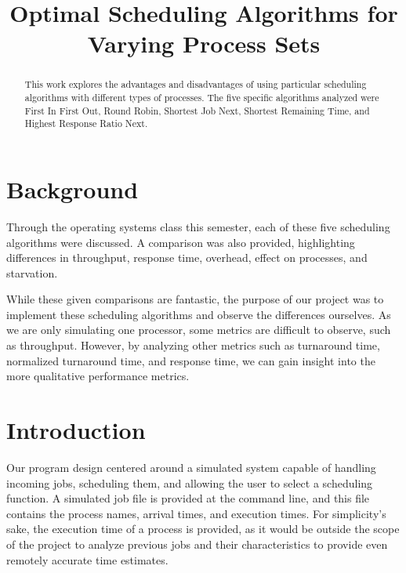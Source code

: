\documentclass[conference,11pt]{IEEEtran}
\begin{document}
%
\title{Optimal Scheduling Algorithms for Varying Process Sets}

\author{
}

\maketitle

\begin{abstract}
This work explores the advantages and disadvantages of using particular scheduling algorithms with different types of processes. The five specific algorithms analyzed were First In First Out, Round Robin, Shortest Job Next, Shortest Remaining Time, and Highest Response Ratio Next.
\end{abstract}

\section{Background}
Through the operating systems class this semester, each of these five scheduling algorithms were discussed. A comparison was also provided, highlighting differences in throughput, response time, overhead, effect on processes, and starvation.

While these given comparisons are fantastic, the purpose of our project was to implement these scheduling algorithms and observe the differences ourselves. As we are only simulating one processor, some metrics are difficult to observe, such as throughput. However, by analyzing other metrics such as turnaround time, normalized turnaround time, and response time, we can gain insight into the more qualitative performance metrics.

\section{Introduction}
Our program design centered around a simulated system capable of handling incoming jobs, scheduling them, and allowing the user to select a scheduling function. A simulated job file is provided at the command line, and this file contains the process names, arrival times, and execution times. For simplicity's sake, the execution time of a process is provided, as it would be outside the scope of the project to analyze previous jobs and their characteristics to provide even remotely accurate time estimates.
\end{document}
